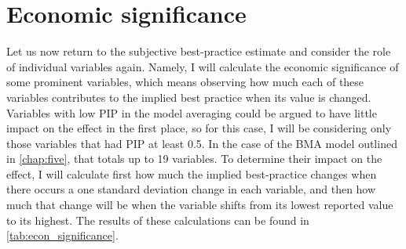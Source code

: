 \section{Economic significance}
\label{sec:economic_significance}

Let us now return to the subjective best-practice estimate and consider the role of individual variables again. Namely, I will calculate the economic significance of some prominent variables, which means observing how much each of these variables contributes to the implied best practice when its value is changed. Variables with low \ac{PIP} in the model averaging could be argued to have little impact on the effect in the first place, so for this case, I will be considering only those variables that had \ac{PIP} at least 0.5. In the case of the \ac{BMA} model outlined in \autoref{chap:five}, that totals up to 19 variables. To determine their impact on the effect, I will calculate first how much the implied best-practice changes when there occurs a one standard deviation change in each variable, and then how much that change will be when the variable shifts from its lowest reported value to its highest. The results of these calculations can be found in \autoref{tab:econ_significance}.


